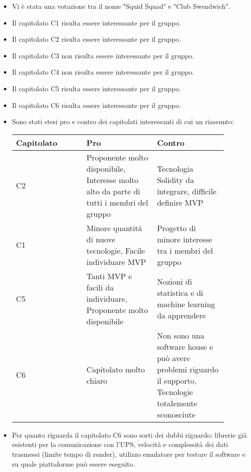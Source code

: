 \begin{itemize}
    \item Vi è stata una votazione tra il nome "Squid Squad" e "Club Swendwich".
    \item Il capitolato C1 risulta essere interessante per il gruppo.
    \item Il capitolato C2 risulta essere interessante per il gruppo.
    \item Il capitolato C3 non risulta essere interessante per il gruppo.
    \item Il capitolato C4 non risulta essere interessante per il gruppo.
    \item Il capitolato C5 risulta essere interessante per il gruppo.
    \item Il capitolato C6 risulta essere interessante per il gruppo.
    \item Sono stati stesi pro e contro dei capitolati interessanti di cui un riassunto: \\
        \begin{tabular}{|p{0.30\linewidth} |p{0.30\linewidth} |p{0.30 \linewidth}|}
        \hline
        Capitolato & Pro & Contro                                                                                                                                             \\
        \hline
        C2         & Proponente molto disponibile, Interesse molto alto da parte di tutti i membri del gruppo & Tecnologia Solidity da integrare, difficile definire MVP \\
        \hline
        C1         & Minore quantità di nuove tecnologie, Facile individuare MVP & Progetto di minore interesse tra i membri del gruppo \\
        \hline
        C5         & Tanti MVP e facili da individuare, Proponente molto disponibile & Nozioni di statistica e di machine learning da apprendere \\
        \hline
        C6         & Capitolato molto chiaro & Non sono una software house e può avere problemi riguardo il supporto, Tecnologie totalemente sconosciute \\
        \hline
        \end{tabular}
    \item Per quanto riguarda il capitolato C6 sono sorti dei dubbi riguardo: librerie già esistenti per la comunicazione con l'UPS, velocità e complessità dei dati trasmessi (limite tempo di render), utilizzo emulatore per testare il software e su quale piattaforme può essere eseguito.

\end{itemize}
